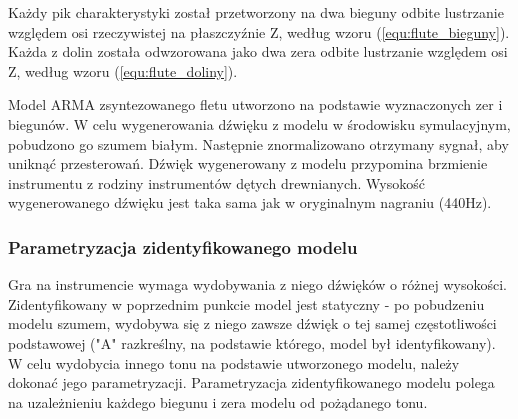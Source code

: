 Każdy pik charakterystyki został przetworzony na dwa bieguny odbite lustrzanie względem osi rzeczywistej na płaszczyźnie Z, według wzoru (\ref{equ:flute_bieguny}). Każda z dolin została odwzorowana jako dwa zera odbite lustrzanie względem osi Z, według wzoru (\ref{equ:flute_doliny}).

Model ARMA zsyntezowanego fletu utworzono na podstawie wyznaczonych zer i biegunów. W celu wygenerowania dźwięku z modelu w środowisku symulacyjnym, pobudzono go szumem białym. Następnie znormalizowano otrzymany sygnał, aby uniknąć przesterowań. Dźwięk wygenerowany z modelu przypomina brzmienie instrumentu z rodziny instrumentów dętych drewnianych. Wysokość wygenerowanego dźwięku jest taka sama jak w oryginalnym nagraniu (440Hz).

\subsubsection{Parametryzacja zidentyfikowanego modelu}
Gra na instrumencie wymaga wydobywania z niego dźwięków o różnej wysokości. Zidentyfikowany w poprzednim punkcie model jest statyczny - po pobudzeniu modelu szumem, wydobywa się z niego zawsze dźwięk o tej samej częstotliwości podstawowej ("A" razkreślny, na podstawie którego, model był identyfikowany). W celu wydobycia innego tonu na podstawie utworzonego modelu, należy dokonać jego parametryzacji. Parametryzacja zidentyfikowanego modelu polega na uzależnieniu każdego biegunu i zera modelu od pożądanego tonu.

